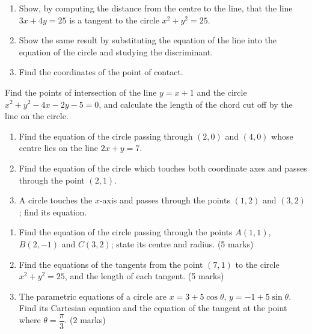 \documentclass[11pt]{article}
\newcounter{popsec}
\newcounter{popsub}
\newcommand{\courssub}[1]{%
  \stepcounter{popsub}%
  \par\vspace{9pt}\noindent{\popxbold\fontsize{11.5}{13}\selectfont\color{popink}{\color{poporange}\thepopsec.\thepopsub}\hspace{6pt}#1}\par\nopagebreak\vspace{4pt}
}
\begin{document}
\begin{exercice}
\begin{enumerate}
\item Show, by computing the distance from the centre to the line, that the line $3x+4y=25$ is a tangent to the circle $x^{2}+y^{2}=25$.
\item Show the same result by substituting the equation of the line into the equation of the circle and studying the discriminant.
\item Find the coordinates of the point of contact.
\end{enumerate}
\end{exercice}

\begin{exercice}
Find the points of intersection of the line $y=x+1$ and the circle $x^{2}+y^{2}-4x-2y-5=0$, and calculate the length of the chord cut off by the line on the circle.
\end{exercice}

\begin{exercice}
\begin{enumerate}
\item Find the equation of the circle passing through $(2,0)$ and $(4,0)$ whose centre lies on the line $2x+y=7$.
\item Find the equation of the circle which touches both coordinate axes and passes through the point $(2,1)$.
\item A circle touches the $x$-axis and passes through the points $(1,2)$ and $(3,2)$; find its equation.
\end{enumerate}
\end{exercice}

\courssub{I prepare for the GCE}

\begin{exercice}
\begin{enumerate}
\item Find the equation of the circle passing through the points $A(1,1)$, $B(2,-1)$ and $C(3,2)$; state its centre and radius. \hfill (5 marks)
\item Find the equations of the tangents from the point $(7,1)$ to the circle $x^{2}+y^{2}=25$, and the length of each tangent. \hfill (5 marks)
\item The parametric equations of a circle are $x=3+5\cos\theta$, $y=-1+5\sin\theta$. Find its Cartesian equation and the equation of the tangent at the point where $\theta=\dfrac{\pi}{3}$. \hfill (2 marks)
\end{enumerate}
\end{exercice}
\end{document}
